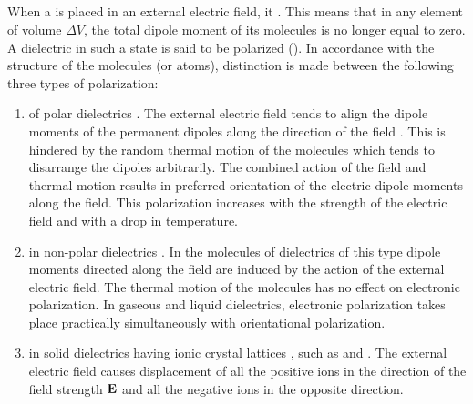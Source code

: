 \subsection{}\label{18.2.2} When a  is placed in an external electric field, it . This means that in any element of volume $\Delta V$, the total dipole moment of its molecules is no longer equal to zero. A dielectric in such a state is said to be polarized (). In accordance with the structure of the molecules (or atoms), distinction is made between the following three types of polarization:
\begin{enumerate}[label=(\alph*)]
\item {} of polar dielectrics . The external electric field tends to align the dipole moments of the permanent dipoles along the direction of the field . This is hindered by the random thermal motion of the molecules which tends to disarrange the dipoles arbitrarily. The combined action of the field and thermal motion results in preferred orientation of the electric dipole moments along the field. This polarization increases with the strength of the electric field and with a drop in temperature.
\item {} in non-polar dielectrics . In the molecules of dielectrics of this type dipole moments directed along the field are induced  by the action of the external electric field. The thermal motion of the molecules has no effect on electronic polarization. In gaseous and liquid dielectrics, electronic polarization takes place practically simultaneously with orientational polarization.
\item {} in solid dielectrics having ionic crystal lattices , such as  and . The external electric field causes displacement of all the positive ions in the direction of the field strength $\vb{E}$ and all the negative ions in the opposite direction.
\end{enumerate}

